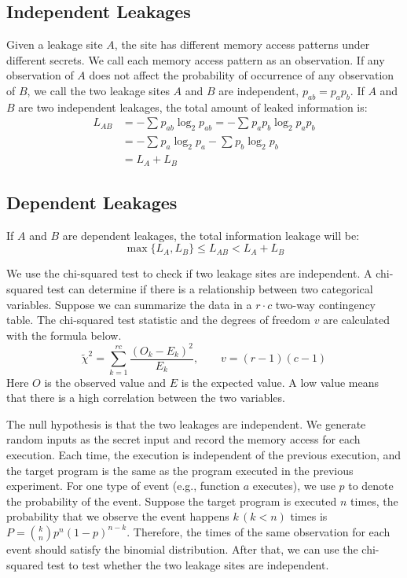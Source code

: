 \subsection{Independent Leakages}
Given a leakage site $A$, the site has different memory access patterns under different secrets. We call each memory access pattern as an observation. If any observation of $A$ does not affect the probability of occurrence of any observation of $B$, we call the two leakage sites $A$ and $B$ are independent, $p_{ab} = p_ap_b$.
If $A$ and $B$ are two independent leakages, the total amount of leaked information is:
\begin{align*} 
L_{\mathit{AB}} &= - \sum_{}p_{ab}\log_2p_{ab} = - \sum_{}p_ap_b\log_2p_ap_b \\
                &= - \sum_{}p_{a}\log_2p_{a} - \sum_{}p_{b}\log_2p_{b} \\
                &= L_A + L_B
\end{align*} 

\subsection{Dependent Leakages}
If $A$ and $B$ are dependent leakages, the total information leakage will be:
\[\max{\{L_A, L_B\}}  \leq L_{\mathit{AB}} < L_A + L_B\]

We use the chi-squared test to check if two leakage sites are independent. A chi-squared test can determine if there is a relationship between two categorical variables. Suppose we can summarize the data in a $r \cdot c$ two-way contingency table. The chi-squared test statistic and the degrees of freedom $v$ are calculated with the formula below.
\[\tilde{\chi}^2=\sum_{k=1}^{rc} \frac{(O_k - E_k)^2}{E_k}, \qquad 	 v = (r - 1)(c - 1)\]
Here $O$ is the observed value and $E$ is the expected value. A low value means that there is a high correlation between the two variables. 

The null hypothesis is that the two leakages are independent.
We generate random inputs as the secret input and record the memory access for each execution. Each time, the execution is independent of the previous execution, and the target program is the same as the program executed in the previous experiment. For one type of event (e.g., function $a$ executes), we use $p$ to denote the probability of the event. Suppose the target program is executed $n$ times, the probability that we observe the event happens $k \,(k < n)$ times is $P = \binom{k}{n}p^n(1-p)^{n-k}$. Therefore, the times of the same observation for each event should satisfy the binomial distribution. After that, we can use the chi-squared test to test whether the two leakage sites are independent.

